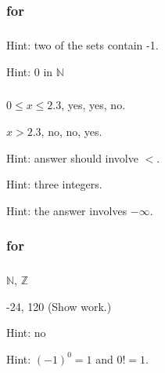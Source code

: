 \subsection{\answers}

\subsubsection{\answers for  \subinfsetsnumbers}

\subsubsection*{ \answers}
\begin{apart}
    \item Hint: two of the sets contain -1.
    \item Hint: 0 in $\mathbb{N}$
\end{apart}

\subsubsection*{ \answers}
\begin{apart}
    \item $0 \le x \le 2.3$,
    yes, yes, no.
    \item $x > 2.3$, no, no, yes.
    \item Hint: answer should involve $<$.
    \item Hint: three integers.
    \item Hint: the answer involves $-\infty$.
\end{apart}

\subsubsection{\answers for  \subdefnfnnotation}

\subsubsection*{ \answers}
\begin{apart}
    \item $\mathbb{N}$, $\mathbb{Z}$
    \item -24, 120 (Show work.)
    \item Hint: no
    \item Hint: $(-1)^0=1$ and $0!=1$.
\end{apart}

